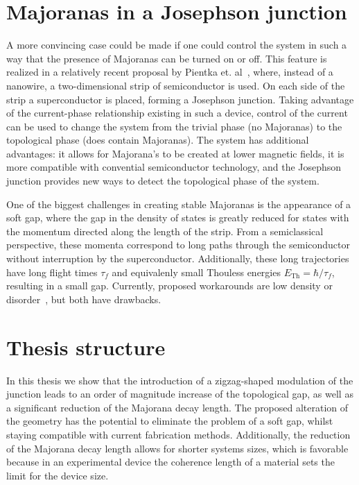 \section{Majoranas in a Josephson junction}
	A more convincing case could be made if one could control the system in such a way that the presence of Majoranas can be turned on or off.
	This feature is realized in a relatively recent proposal by Pientka et. al~\cite{pientka_topological_2017}, where, instead of a nanowire, a two-dimensional strip of semiconductor is used.
	On each side of the strip a superconductor is placed, forming a Josephson junction.
	Taking advantage of the current-phase relationship existing in such a device, control of the current can be used to change the system from the trivial phase (no Majoranas) to the topological phase (does contain Majoranas).
	The system has additional advantages: it allows for Majorana's to be created at lower magnetic fields, it is more compatible with convential semiconductor technology, and the Josephson junction provides new ways to detect the topological phase of the system.

	One of the biggest challenges in creating stable Majoranas is the appearance of a soft gap, where the gap in the density of states is greatly reduced for states with the momentum directed along the length of the strip.
	From a semiclassical perspective, these momenta correspond to long paths through the semiconductor without interruption by the superconductor.
	Additionally, these long trajectories have long flight times $\tau_f$ and equivalenly small Thouless energies $E_{\textrm{Th}}=\hbar / \tau_f$, resulting in a small gap. 
	Currently, proposed workarounds are low density or disorder~\cite{haim_double-edge_2018}, but both have drawbacks.

\section{Thesis structure}
	In this thesis we show that the introduction of a zigzag-shaped modulation of the junction leads to an order of magnitude increase of the topological gap, as well as a significant reduction of the Majorana decay length.
	The proposed alteration of the geometry has the potential to eliminate the problem of a soft gap, whilst staying compatible with current fabrication methods.
	Additionally, the reduction of the Majorana decay length allows for shorter systems sizes, which is favorable because in an experimental device the coherence length of a material sets the limit for the device size.
	
